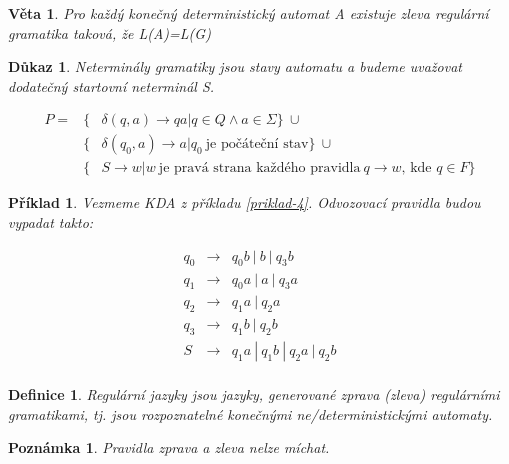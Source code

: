 \documentclass[10pt, a4paper, titlepage]{article}
\theoremstyle{note}
\newtheorem{veta}{\textbf{Věta}}
\newtheorem{definice}{\textbf{Definice}}
\newtheorem{dukaz}{\textbf{Důkaz}}
\newtheorem{priklad}{\textbf{Příklad}}
\newtheorem{poznamka}{\textbf{Poznámka}}
\begin{document}
\begin{veta}
Pro každý konečný deterministický automat \textit{A} existuje zleva regulární gramatika taková, že \textit{L(A)=L(G)}
\end{veta}

\begin{dukaz}
Neterminály gramatiky jsou stavy automatu a budeme uvažovat dodatečný startovní neterminál S.

\begin{eqnarray*}
P = &\lbrace& \delta (q,a) \rightarrow qa | q \in Q \wedge a \in \Sigma \rbrace \ \cup \\
&\lbrace& \delta (q_0,a) \rightarrow a | q_0\ \text{je počáteční stav} \rbrace \ \cup \\
&\lbrace& S \rightarrow w|w \ \text{je pravá strana každého pravidla}\ q \rightarrow w\text{, kde } q \in F \rbrace
\end{eqnarray*}

\end{dukaz}

\begin{priklad}
Vezmeme KDA z příkladu \ref{priklad-4}.
Odvozovací pravidla budou vypadat takto:

\begin{eqnarray*}
q_0 &\rightarrow& q_{0}b\ |\ b\ |\ q_{3}b \\
q_1 &\rightarrow& q_{0}a\ |\ a\ |\ q_{3}a \\
q_2 &\rightarrow& q_{1}a\ |\ q_{2}a \\
q_3 &\rightarrow& q_{1}b\ |\ q_{2}b \\
S &\rightarrow& q_{1}a\ |\ q_{1}b\ |\ q_{2}a\ |\ q_{2}b \\
\end{eqnarray*}

\end{priklad}

\begin{definice}
Regulární jazyky jsou jazyky, generované zprava (zleva) regulárními gramatikami, tj. jsou rozpoznatelné konečnými ne/deterministickými automaty.
\end{definice}

\begin{poznamka}
Pravidla zprava a zleva nelze míchat.
\end{poznamka}
\end{document}
